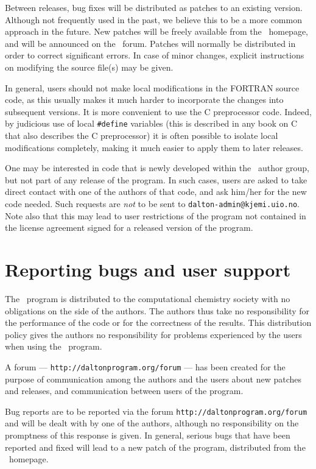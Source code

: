 Between releases, bug fixes will be distributed as
patches to an
existing version. Although not frequently used in the past, we believe
this to be a more common approach in the future. New patches will be
freely available from the 
\dalton\ homepage, and will be announced on the \dalton\ forum.
Patches will normally be distributed in order to correct
significant errors. In case of minor changes, explicit
instructions on modifying the source file(s) may be given.

In general, users should not make local
modifications in the FORTRAN source code, as this usually makes it
much harder to incorporate the changes into subsequent versions.
It is more convenient to use the C preprocessor code.  Indeed, by
judicious use of local \verb|#define| variables (this
is described in any book on C that also describes the C
preprocessor) it is often possible to isolate local
modifications completely, making it much easier
to apply them to later
releases.

One may be interested in code that is newly developed within the
\dalton\ author group, but not part of any release of the program. In
such cases, users are asked to take direct contact with one of the
authors of that code, and ask him/her for the new code
needed. Such requests are {\em not} to be sent to
\verb|dalton-admin@kjemi.uio.no|. Note also that this may lead to user
restrictions of the program not contained in the license agreement
signed for a released version of the program.

\section{Reporting bugs and user support}

The \dalton\ program is distributed to the computational chemistry
society with no obligations on the side of the
authors. The authors thus take no responsibility
for the performance
of the code or for the correctness of the
results. This distribution
policy gives the authors no responsibility for problems experienced by
the users when using the \dalton\ program.

A forum ---
\verb|http://daltonprogram.org/forum| --- has been created for
the purpose of communication among the authors and the users about
new patches and releases, and communication between users of the
program.

Bug reports are to be reported via the forum \verb|http://daltonprogram.org/forum| and
will be dealt with by one of the authors, although no responsibility
on the promptness of this response is given. In general, serious bugs
that have been
reported and fixed will lead to a new patch of the program, distributed from the
\dalton\ homepage.

